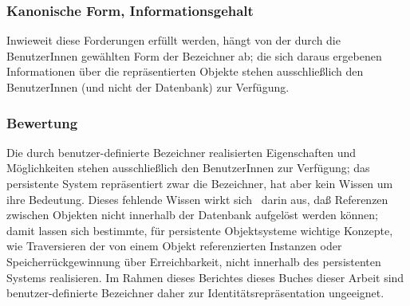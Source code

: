 \subsubsection{Kanonische Form, Informationsgehalt}
%
Inwieweit diese Forderungen erf\"{u}llt werden, h\"{a}ngt von der durch die
BenutzerInnen gew\"{a}hlten Form der Bezeichner ab; die sich daraus
ergebenen Informationen \"{u}ber die repr\"{a}sentierten Objekte stehen
ausschlie\ss{}lich den BenutzerInnen (und nicht der Datenbank) zur
Verf\"{u}gung.
%
\subsubsection{Bewertung}
%
Die durch benutzer-definierte Bezeichner realisierten Eigenschaften
und M\"{o}glichkeiten stehen ausschlie\ss{}lich den BenutzerInnen zur
Verf\"{u}gung; das persistente System repr\"{a}sentiert zwar die
Bezeichner, hat aber kein Wissen um ihre Bedeutung. Dieses fehlende
Wissen wirkt sich \ua\ darin aus, da\ss{} Referenzen zwischen Objekten
nicht innerhalb der Datenbank aufgel\"{o}st werden k\"{o}nnen; damit
lassen sich bestimmte, f\"{u}r persistente Objektsysteme wichtige
Konzepte, wie Traversieren der von einem Objekt referenzierten
Instanzen oder Speicherr\"{u}ckgewinnung \"{u}ber Erreichbarkeit,
nicht innerhalb des persistenten Systems realisieren. Im Rahmen
\ifbericht dieses Berichtes \else\ifbuch dieses Buches \else dieser
Arbeit \fi\fi sind benutzer-definierte Bezeichner daher zur
Identit\"{a}tsrepr\"{a}sentation ungeeignet.
%
